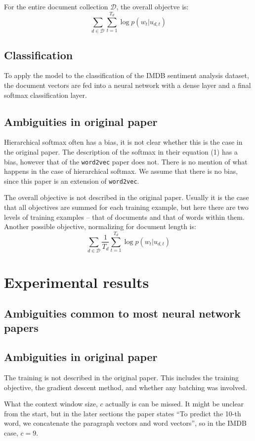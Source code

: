 \documentclass{article}
\begin{document}
For the entire document collection $\mathcal{D}$, the overall objectve is:
    \[\sum_{d\in\mathcal{D}}\sum_{t=1}^{T_d} \log p(w_t|u_{d,t})\]

\subsection{Classification}
To apply the model to the classification of the IMDB sentiment analysis dataset, the document vectors are fed into a neural network with a dense layer and a final softmax classification layer.

\subsection{Ambiguities in original paper}
Hierarchical softmax often has a bias, it is not clear whether this is the case in the original paper. The description of the softmax in their equation (1) has a bias, however that of the \texttt{word2vec} paper does not. There is no mention of what happens in the case of hierarchical softmax. We assume that there is no bias, since this paper is an extension of \texttt{word2vec}.

The overall objective is not described in the original paper. Usually it is the case that all objectives are summed for each training example, but here there are two levels of training examples -- that of documents and that of words within them. Another possible objective, normalizing for document length is:
    \[\sum_{d\in\mathcal{D}}\frac{1}{T_d}\sum_{t=1}^{T_d} \log p(w_t|u_{d,t})\]

\section{Experimental results}

\subsection{Ambiguities common to most neural network papers}

\subsection{Ambiguities in original paper}
The training is not described in the original paper. This includes the training objective, the gradient descent method, and whether any batching was involved.

What the context window size, $c$ actually is can be missed. It might be unclear from the start, but in the later sections the paper states ``To predict the 10-th word, we concatenate the paragraph vectors and word vectors'', so in the IMDB case, $c=9$.
\end{document}
